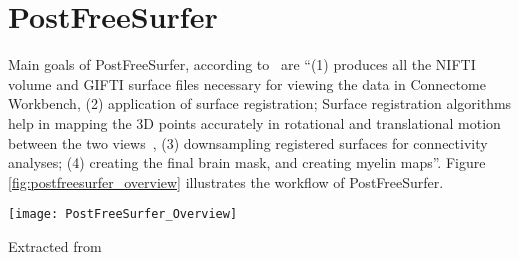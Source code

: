 \section{PostFreeSurfer} \label{sec:PostFreeSurfer}
Main goals of PostFreeSurfer, according to~\cite{Gla13} are ``(1) 
produces all the NIFTI volume and GIFTI surface files necessary for 
viewing the data in Connectome Workbench, (2) application of surface 
registration; Surface registration algorithms help in mapping the 3D 
points accurately in rotational and translational motion between the 
two views~\cite{DBLP:journals/corr/HrgeticP13}, (3) downsampling 
registered surfaces for connectivity analyses; (4) creating the final 
brain mask, and creating myelin maps''. Figure 
\ref{fig:postfreesurfer_overview} illustrates the workflow of 
PostFreeSurfer. 

\begin{center}
  \texttt{[image: PostFreeSurfer\_Overview]}
  \label{fig:postfreesurfer_overview}
  \caption*{Extracted from \cite{Gla13}}
\end{center}

